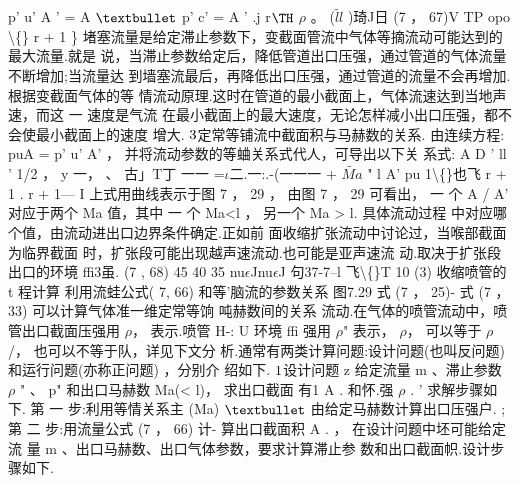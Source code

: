 p' u' A ' = A ${\rm •}$ p' c' = A ' .j r${\rm Þ}$ $\rho$ 。 ($\tilde{ll}$ )琦J日 (7 ， 67)V TP opo \textbackslash\{\} r + 1 \} 堵塞流量是给定滞止参数下，变截面管流中气体等摘流动可能达到的最大流量.就是 说，当滞止参数给定后，降低管道出口压强，通过管道的气体流量不断增加;当流量达 到墙塞流最后，再降低出口压强，通过管道的流量不会再增加.根据变截面气体的等 情流动原理.这时在管道的最小截面上，气体流速达到当地声速，而这 一 速度是气流 在最小截面上的最大速度，无论怎样减小出口压强，都不会使最小截面上的速度 增大. ${\rm 3}$定常等铺流中截面积与马赫数的关系. 由连续方程: puA = p' u' A' ， 并将流动参数的等蛐关系式代人，可导出以下关 系式: A D ' ll ' 1/2 ， y 一， 、 古」T丁 一一 =$\iota$二.一:.-(一一一 + $\tilde{Ma}$ " l A' pu 1\textbackslash\{\}也飞 r + 1 . r + 1--- I 上式用曲线表示于图 7 ， 29 ， 由图 7 ， 29 可看出， 一 个 A / A' 对应于两个 Ma 值，其中 一 个 Ma<l ， 另一个 Ma > l. 具体流动过程 中对应哪个值，由流动进出口边界条件确定.正如前 面收缩扩张流动中讨论过，当喉部截面为临界截面 时，扩张段可能出现越声速流动.也可能是亚声速流 动.取决于扩张段出口的环境 ffi3虽. (7 , 68) 45 40 35 nu$\epsilon$Jnu$\epsilon$J 句37-7--l 飞\textbackslash\{\}T 10 (3) 收缩喷管的 t 程计算 利用流蛙公式( 7, 66) 和等'脑流的参数关系 图7.29 式 (7 ， 25)- 式 (7 ， 33) 可以计算气体准一维定常等饷 吨赫数间的关系 流动.在气体的喷管流动中，喷管出口截面压强用 $\rho$， 表示.喷管 H-: U 环境 ffi 强用 $\rho$" 表示， $\rho$， 可以等于 $\rho$ /， 也可以不等于队，详见下文分 析.通常有两类计算问题:设计问题(也叫反问题)和运行问题(亦称正问题) ，分别介 绍如下. ${\rm 1}$设计问题 z 给定流量 m 、滞止参数 $\rho$ " 、 p" 和出口马赫数 Ma(< l)， 求出口截面 有1 A . 和怀.强 $\rho$ . ' 求解步骤如下. 第 一 步:利用等情关系主 (Ma) ${\rm •}$ 由给定马赫数计算出口压强户. ; 第 二 步:用流量公式 (7 ， 66) 计- 算出口截面积 A . ， 在设计问题中坯可能给定流 量 m 、出口马赫数、出口气体参数，要求计算滞止参 数和出口截面帜.设计步骤如下.

